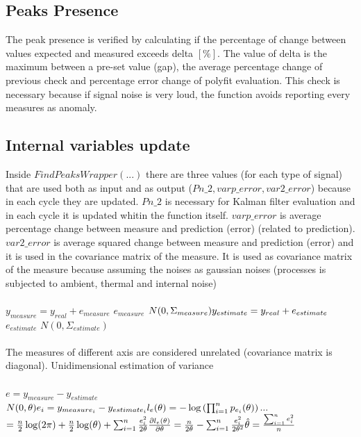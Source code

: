 \documentclass[journal]{IEEEtran}
\begin{document}
\subsection{Peaks Presence}
The peak presence is verified by calculating if the percentage of change between values expected and measured exceeds delta $[\%]$.
The value of delta is the maximum between a pre-set value (gap), the average percentage change of previous check and percentage error change of polyfit evaluation. This check is necessary because if signal noise is very loud, the function avoids reporting every measures as anomaly.

\subsection{Internal variables update}
Inside $FindPeaksWrapper(...)$ there are three values (for each type of signal) that are used both as input and as output ($Pn\_2, varp\_error, var2\_error$) because in each cycle they are updated.
$Pn\_2$ is necessary for Kalman filter evaluation and in each cycle it is updated whitin the function itself.
$varp\_error$ is average percentage change between measure and prediction (error) (related to prediction).
$var2\_error$ is average squared change between measure and prediction (error) and it is used in the covariance matrix of the measure.
It is used as covariance matrix of the measure because assuming the noises as gaussian noises (processes is subjected to ambient, thermal and internal noise)
\\\\
$
y_{measure} = y_{real} + e_{measure} $ \quad $ e_{measure} $ \texttildelow $ N(0, \Sigma_{measure})
\\
y_{estimate} = y_{real} + e_{estimate} $ \quad $ e_{estimate} $ \texttildelow $ N(0, \Sigma_{estimate})
$
\\\\
The measures of different axis are considered unrelated (covariance matrix is diagonal).
Unidimensional estimation of variance
\\\\
$
e = y_{measure} - y_{estimate} $ \quad \quad \quad $ N(0, \theta)
\\
e_{i} = y_{measure_{i}} - y_{estimate_{i}}
\\
l_{e}(\theta) = -\log \left ( \prod_{i=1}^n p_{e_i}(\theta) \right ) 
\\ 
...$ \hspace{3mm} $ = \frac{n}{2}\log(2\pi) + \frac{n}{2}\log(\theta) + \sum_{i=1}^n \frac{e_i^2}{2\theta}
\\
\frac{\partial l_{e}(\theta)}{\partial \theta} = \frac{n}{2\theta}- \sum_{i=1}^n \frac{e_i^2}{2\theta^2}
\\
\hat\theta = \frac{\sum_{i=1}^n e_i^2}{n}
$
\end{document}
